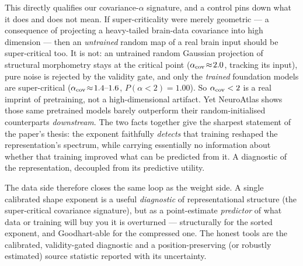 This directly qualifies our covariance-$\alpha$ signature, and a control pins down what it does and does not
mean. If super-criticality were merely geometric --- a consequence of projecting a heavy-tailed brain-data
covariance into high dimension --- then an \emph{untrained} random map of a real brain input should be
super-critical too. It is not: an untrained random Gaussian projection of structural morphometry stays at
the critical point ($\alpha_{\rm cov}\!\approx\!2.0$, tracking its input), pure noise is rejected by
the validity gate, and only the \emph{trained} foundation models are super-critical
($\alpha_{\rm cov}\!\approx\!1.4\text{--}1.6$, $P(\alpha<2)=1.00$). So $\alpha_{\rm cov}<2$ is a real imprint
of pretraining, not a high-dimensional artifact. Yet NeuroAtlas shows those same pretrained models barely
outperform their random-initialised counterparts \emph{downstream}. The two facts together give the sharpest
statement of the paper's thesis: the exponent faithfully \emph{detects} that training reshaped the
representation's spectrum, while carrying essentially no information about whether that training improved
what can be predicted from it. A diagnostic of the representation, decoupled from its predictive utility.

The data side therefore closes the same loop as the weight side. A single calibrated shape exponent is a
useful \emph{diagnostic} of representational structure (the super-critical covariance signature), but as
a point-estimate \emph{predictor} of what data or training will buy you it is overturned --- structurally
for the sorted exponent, and Goodhart-able for the compressed one. The honest tools are the calibrated,
validity-gated diagnostic and a position-preserving (or robustly estimated) source statistic reported
with its uncertainty.
